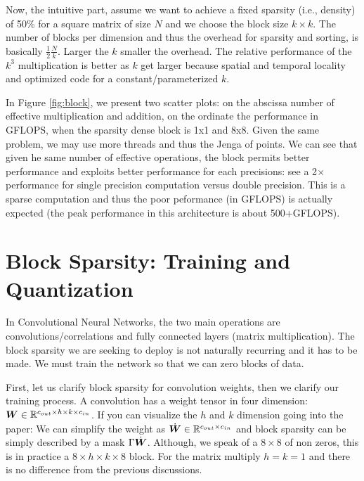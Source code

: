 \documentclass[conference]{IEEEtran}
\begin{document}
Now, the intuitive part, assume we want to achieve a fixed sparsity
(i.e., density) of 50\% for a square matrix of size $N$ and we choose
the block size $k \times k$. The number of blocks per dimension and
thus the overhead for sparsity and sorting, is basically
$\frac{1}{2}\frac{N}{k}$. Larger the $k$ smaller the overhead.  The
relative performance of the $k^3$ multiplication is better as $k$ get
larger because spatial and temporal locality and optimized code for a
constant/parameterized $k$.

 In Figure \ref{fig:block}, we present two
scatter plots: on the abscissa number of effective multiplication and
addition, on the ordinate the performance in GFLOPS, when the sparsity
dense block is 1x1 and 8x8. Given the same problem, we may use more
threads and thus the Jenga of points.  We can see that given he same
number of effective operations, the block permits better performance
and exploits better performance for each precisions: see a 2{$\times$}
performance for single precision computation versus double
precision. This is a sparse computation and thus the poor
peformance (in GFLOPS) is actually expected (the peak performance in
this architecture is about 500+GFLOPS).




\section{Block Sparsity: Training and Quantization}
\label{sec:training}

In Convolutional Neural Networks, the two main operations are
convolutions/correlations and fully connected layers (matrix
multiplication). The block sparsity we are seeking to deploy is not
naturally recurring and it has to be made. We must train the network
so that we can zero blocks of data.

First, let us clarify block sparsity for convolution weights, then we
clarify our training process. A convolution has a weight tensor in
four dimension: ${\boldsymbol W} \in \mathbb{R}^{c_{out}\times h \times k \times
  c_{in}}$. If you can visualize the $h$ and $k$ dimension going into
the paper: We can simplify the weight as $\dot{{\boldsymbol W}} \in \mathbb{R}^{c_{out}
  \times c_{in}}$ and block sparsity can be simply described by a mask
$\Gamma\dot{{\boldsymbol W}}$. Although, we speak of a $8\times 8$ of non
zeros, this is in practice a $8\times h\times k\times 8$ block. For
the matrix multiply $h=k=1$ and there is no difference from the
previous discussions.
\end{document}
